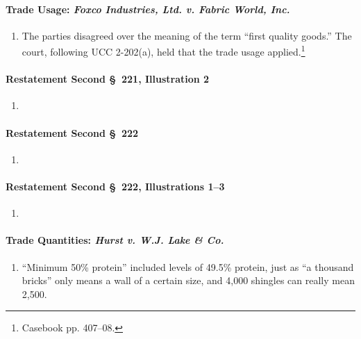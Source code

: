 \paragraph{Trade Usage: \emph{Foxco Industries, Ltd. v. Fabric World, Inc.}}

\begin{enumerate}
    \item The parties disagreed over the meaning of the term ``first quality 
    goods.'' The court, following UCC 2-202(a), held that the trade usage 
    applied.\footnote{Casebook pp. 407--08.}
\end{enumerate}

\paragraph{Restatement Second \S\ 221, Illustration 2}

\begin{enumerate}
    \item %
\end{enumerate}

\paragraph{Restatement Second \S\ 222}

\begin{enumerate}
    \item %
\end{enumerate}

\paragraph{Restatement Second \S\ 222, Illustrations 1--3}

\begin{enumerate}
    \item %
\end{enumerate}

\paragraph{Trade Quantities: \emph{Hurst v. W.J. Lake \& Co.}}

\begin{enumerate}
    \item ``Minimum 50\% protein'' included levels of 49.5\% protein, just as 
    ``a thousand bricks'' only means a wall of a certain size, and 4,000 
    shingles can really mean 2,500.
\end{enumerate}

